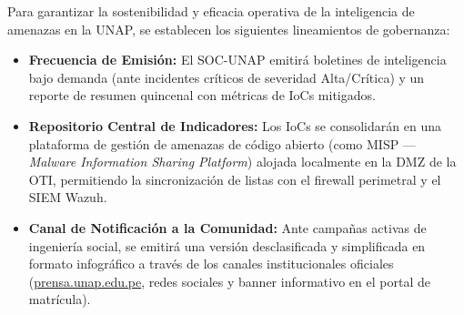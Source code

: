Para garantizar la sostenibilidad y eficacia operativa de la inteligencia de amenazas en la UNAP, se establecen los siguientes lineamientos de gobernanza:

\begin{itemize}[itemsep=0.8pt,topsep=0.5pt,parsep=0pt]
    \item \textbf{Frecuencia de Emisión:} El SOC-UNAP emitirá boletines de inteligencia bajo demanda (ante incidentes críticos de severidad Alta/Crítica) y un reporte de resumen quincenal con métricas de IoCs mitigados.
    \item \textbf{Repositorio Central de Indicadores:} Los IoCs se consolidarán en una plataforma de gestión de amenazas de código abierto (como MISP --- \textit{Malware Information Sharing Platform}) alojada localmente en la DMZ de la OTI, permitiendo la sincronización de listas con el firewall perimetral y el SIEM Wazuh.
    \item \textbf{Canal de Notificación a la Comunidad:} Ante campañas activas de ingeniería social, se emitirá una versión desclasificada y simplificada en formato infográfico a través de los canales institucionales oficiales (\url{prensa.unap.edu.pe}, redes sociales y banner informativo en el portal de matrícula).
\end{itemize}